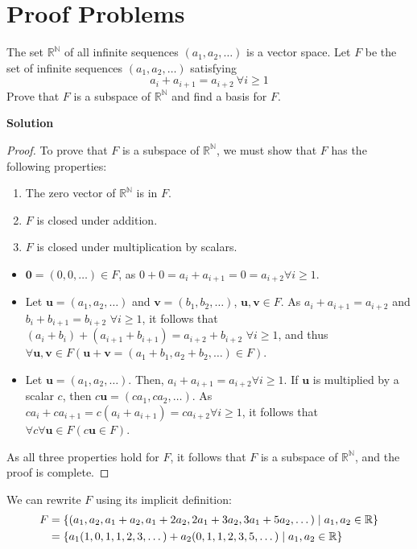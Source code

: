 \documentclass[11pt]{scrartcl}
\theoremstyle{dotlessP}
\theoremstyle{dotlessN}
\DeclarePairedDelimiter\set{\{}{\}}
\newcommand{\reals}{\mathbb{R}} %
\newcommand{\nats}{\mathbb{N}}
\begin{document}
\section{Proof Problems}
\begin{ques}
	The set $\reals^\nats$ of all infinite sequences $(a_1, a_2, \dots)$ is a vector space. Let $F$ be the set of infinite sequences $(a_1, a_2, \dots)$ satisfying
	\[
		a_i + a_{i+1} = a_{i+2} \ \forall i \geq 1
	\] 
	Prove that $F$ is a subspace of $\reals^{\nats}$ and find a basis for $F$.
\end{ques}
\textbf{Solution}
\begin{proof}
	To prove that $F$ is a subspace of $\reals^\nats$, we must show that $F$ has the following properties:
	\begin{enumerate}[1.]
		\item The zero vector of $\reals^\nats$ is in $F$.
		\item $F$ is closed under addition.
		\item $F$ is closed under multiplication by scalars.
	\end{enumerate}
	\begin{itemize}
		\item $\bm{0} = (0,0,\dots) \in F$, as $0 + 0 = a_i + a_{i+1} = 0 = a_{i+2} \forall i \geq 1$.
		\item Let $\bm{u} = (a_1, a_2, \dots)$ and $\bm{v} = (b_1, b_2, \dots)$, $\bm{u}, \bm{v} \in F$. As $a_i + a_{i+1} = a_{i+2}$ and $b_i + b_{i+1} = b_{i+2}$ $\forall i \geq 1$, it follows that $(a_i + b_i) + (a_{i+1} + b_{i+1}) = a_{i+2} + b_{i+2}$ $\forall i \geq 1$, and thus $\forall \bm{u},\bm{v} \in F(\bm{u} + \bm{v} = (a_1 + b_1, a_2 + b_2, \dots) \in F)$.
		\item Let $\bm{u} = (a_1, a_2, \dots)$. Then, $a_i + a_{i+1} = a_{i+2} \forall i \geq 1$. If $\bm{u}$ is multiplied by a scalar $c$, then $c\bm{u} = (ca_1, ca_2, \dots)$. As $ca_i + ca_{i+1} = c(a_i + a_{i+1}) = ca_{i+2} \forall i \geq 1$, it follows that $\forall c \forall \bm{u} \in F(c\bm{u} \in F)$.
	\end{itemize}
	As all three properties hold for $F$, it follows that $F$ is a subspace of $\reals^\nats$, and the proof is complete.
\end{proof}
We can rewrite $F$ using its implicit definition:
\begin{align*}
	F &= \set*{(a_1, a_2, a_1 + a_2, a_1 + 2a_2, 2a_1 + 3a_2, 3a_1 + 5a_2, \dots) \mid a_1, a_2 \in \reals} \\
	  &= \set*{a_1(1, 0, 1, 1, 2, 3, \dots) + a_2(0, 1, 1, 2, 3, 5, \dots) \mid a_1, a_2 \in \reals}
\end{align*}
\end{document}
